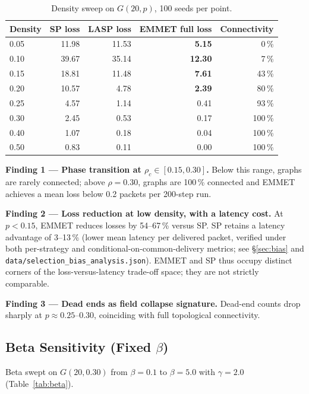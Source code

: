 \documentclass[11pt,a4paper]{article}
\begin{document}
\begin{table}[h]
\centering
\caption{Density sweep on $G(20, p)$, 100 seeds per point.}
\label{tab:density}
\begin{tabular}{lrrrr}
\toprule
Density & SP loss & LASP loss & EMMET full loss & Connectivity \\
\midrule
0.05 & 11.98 & 11.53 & \textbf{5.15}  & 0\,\% \\
0.10 & 39.67 & 35.14 & \textbf{12.30} & 7\,\% \\
0.15 & 18.81 & 11.48 & \textbf{7.61}  & 43\,\% \\
0.20 & 10.57 & 4.78  & \textbf{2.39}  & 80\,\% \\
0.25 & 4.57  & 1.14  & 0.41           & 93\,\% \\
0.30 & 2.45  & 0.53  & 0.17           & 100\,\% \\
0.40 & 1.07  & 0.18  & 0.04           & 100\,\% \\
0.50 & 0.83  & 0.11  & 0.00           & 100\,\% \\
\bottomrule
\end{tabular}
\end{table}

\textbf{Finding 1 --- Phase transition at $\rho_c \in [0.15, 0.30]$.}
Below this range, graphs are rarely connected; above $\rho = 0.30$,
graphs are 100\,\% connected and EMMET achieves a mean loss below 0.2 packets per 200-step run.

\textbf{Finding 2 --- Loss reduction at low density, with a latency
cost.} At $p < 0.15$, EMMET reduces losses by 54--67\,\% versus SP.
SP retains a latency advantage of 3--13\,\% (lower mean latency per
delivered packet, verified under both per-strategy and
conditional-on-common-delivery metrics; see \S\ref{sec:bias} and
\texttt{data/selection\_bias\_analysis.json}). EMMET and SP thus
occupy distinct corners of the loss-versus-latency trade-off space;
they are not strictly comparable.

\textbf{Finding 3 --- Dead ends as field collapse signature.}
Dead-end counts drop sharply at $p \approx 0.25$--$0.30$, coinciding
with full topological connectivity.

\subsection{Beta Sensitivity (Fixed \texorpdfstring{$\beta$}{beta})}

Beta swept on $G(20, 0.30)$ from $\beta{=}0.1$ to $\beta{=}5.0$ with
$\gamma{=}2.0$ (Table~\ref{tab:beta}).
\end{document}
